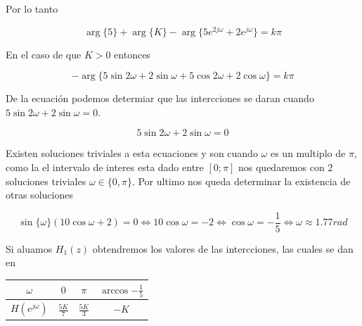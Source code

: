 \documentclass{article}
\begin{document}
            Por lo tanto 

            \begin{equation}
                \arg \{ 5 \} + \arg\{K \}  - \arg\{ 5e^{2j\omega} + 2e^{j\omega} \} = k\pi
            \end{equation}

            En el caso de que $K>0$ entonces 

            \begin{equation}
                - \arg\{ 5\sin{2\omega} + 2\sin{\omega}+ 5\cos{2\omega} + 2\cos{\omega} \} = k\pi
            \end{equation}

            De la ecuación podemos determiar que las intercciones se daran cuando $5\sin{2\omega} + 2\sin{\omega}= 0$. 

            \begin{equation}
                5\sin{ 2\omega } + 2\sin{ \omega } = 0
            \end{equation}

            Existen soluciones triviales a esta ecuaciones y son cuando $\omega$ es un multiplo de $\pi$, como la el intervalo de interes esta 
            dado entre $[0;\pi]$ nos quedaremos con 2 soluciones triviales $\omega \in \{ 0, \pi \}$. Por ultimo nos queda determinar la existencia de 
            otras soluciones 
            
            \begin{equation}
                \sin\{ \omega \}( 10\cos{ \omega } + 2 ) = 0 \Leftrightarrow
                10\cos{ \omega } = -2 \Leftrightarrow
                \cos{ \omega } = -\frac{1}{5} \Leftrightarrow
                \omega \approx 1.77 rad
            \end{equation}

            Si aluamos $H_1(z)$ obtendremos los valores de las intercciones, las cuales se dan en 


            \begin{table}[H]
                \centering 
                \begin{tabular}{|c|c|c|c|}
                    \hline $\omega$ & $0$ & $\pi$ & $\arccos{-\frac{1}{5}}$ \\ 
                    \hline $H(e^{j\omega})$ & $\frac{5K}{7}$ & $\frac{5K}{3}$ & $-K$ \\
                    \hline
                \end{tabular}
            \end{table}
\end{document}
